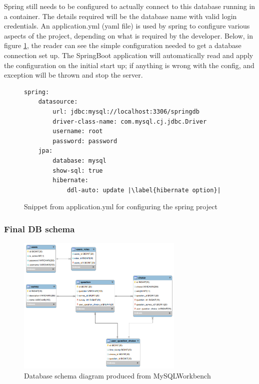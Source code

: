 Spring still needs to be configured to actually connect to this database running in a container.
The details required will be the database name with valid login credentials.
An application.yml (yaml file) is used by spring to configure various aspects of the project, depending on what is required by the developer.
Below, in figure \ref{springymldbconfig}, the reader can see the simple configuration needed to get a database connection set up.
The SpringBoot application will automatically read and apply the configuration on the initial start up; if anything is wrong with the config,
and exception will be thrown and stop the server.

\begin{figure}[ht]
    \centering
    \begin{lstlisting}[escapechar=|]
spring:
    datasource:
        url: jdbc:mysql://localhost:3306/springdb
        driver-class-name: com.mysql.cj.jdbc.Driver
        username: root
        password: password
    jpa:
        database: mysql
        show-sql: true
        hibernate:
            ddl-auto: update |\label{hibernate option}|
    \end{lstlisting}
    \caption{Snippet from application.yml for configuring the spring project}
    \label{springymldbconfig}
\end{figure}

\clearpage
\subsubsection{Final DB schema}

\begin{figure}[ht]
    \centering
    \includegraphics[width=300px]{images/db_schema.png}
    \caption{Database schema diagram produced from MySQLWorkbench}
    \label{sqldbschamfull}
\end{figure}

